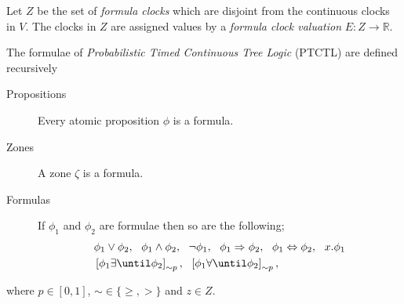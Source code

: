 \begin{defi}
Let $Z$ be the set of \emph{formula clocks} which are disjoint from the continuous clocks in $V$. The clocks in $Z$ are assigned values by a \emph{formula clock valuation} $E : Z \rightarrow \mathbb{R}$.
\end{defi}

\begin{defi}
The formulae of \emph{Probabilistic Timed Continuous Tree Logic} (PTCTL) are defined recursively
\begin{description}
    \item[Propositions]{Every atomic proposition $\phi$ is a formula.}
    \item[Zones]{A zone $\zeta$ is a formula.}
    \item[Formulas]{If $\phi_{1}$ and $\phi_{2}$ are formulae then so are the following;
    \begin{align*}
        & \phi_{1} \lor \phi_{2},\ \ \phi_{1} \land \phi_{2}, \ \ \lnot \phi_{1}, \ \ \phi_{1} \Rightarrow \phi_{2},\ \ \phi_{1} \Leftrightarrow \phi_{2},\ \ x.\phi_{1} \\
        & \left[\phi_{1} \exists\until \phi_{2}\right]_{\sim p}, \ \
          \left[\phi_{1} \forall\until \phi_{2}\right]_{\sim p},
        \end{align*}}
\end{description}
where $p\in[0,1]$, $\sim\in\{\geq,>\}$ and $z\in Z$.
\end{defi}

